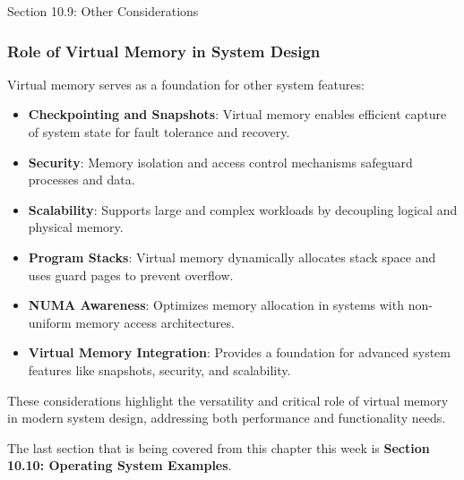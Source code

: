 \begin{notes}{Section 10.9: Other Considerations}
    \subsubsection*{Role of Virtual Memory in System Design}
    
    Virtual memory serves as a foundation for other system features:
    \begin{itemize}
        \item \textbf{Checkpointing and Snapshots}: Virtual memory enables efficient capture of system state for fault tolerance and recovery.
        \item \textbf{Security}: Memory isolation and access control mechanisms safeguard processes and data.
        \item \textbf{Scalability}: Supports large and complex workloads by decoupling logical and physical memory.
    \end{itemize}
    
    \begin{highlight}
    
        \begin{itemize}
            \item \textbf{Program Stacks}: Virtual memory dynamically allocates stack space and uses guard pages to prevent overflow.
            \item \textbf{NUMA Awareness}: Optimizes memory allocation in systems with non-uniform memory access architectures.
            \item \textbf{Virtual Memory Integration}: Provides a foundation for advanced system features like snapshots, security, and scalability.
        \end{itemize}
    
    These considerations highlight the versatility and critical role of virtual memory in modern system design, addressing both performance and functionality needs.
    
    \end{highlight}
\end{notes}

The last section that is being covered from this chapter this week is \textbf{Section 10.10: Operating System Examples}.

